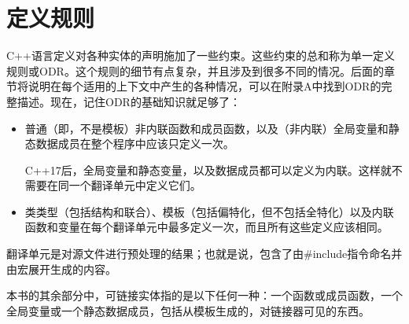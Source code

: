 \section{定义规则}
C++语言定义对各种实体的声明施加了一些约束。这些约束的总和称为单一定义规则或ODR。这个规则的细节有点复杂，并且涉及到很多不同的情况。后面的章节将说明在每个适用的上下文中产生的各种情况，可以在附录A中找到ODR的完整描述。现在，记住ODR的基础知识就足够了：

\begin{itemize}
\item 
普通（即，不是模板）非内联函数和成员函数，以及（非内联）全局变量和静态数据成员在整个程序中应该只定义一次。

\begin{notice}
C++17后，全局变量和静态变量，以及数据成员都可以定义为内联。这样就不需要在同一个翻译单元中定义它们。
\end{notice}

\item 
类类型（包括结构和联合）、模板（包括偏特化，但不包括全特化）以及内联函数和变量在每个翻译单元中最多定义一次，而且所有这些定义应该相同。
\end{itemize}

翻译单元是对源文件进行预处理的结果；也就是说，包含了由\#include指令命名并由宏展开生成的内容。

本书的其余部分中，可链接实体指的是以下任何一种：一个函数或成员函数，一个全局变量或一个静态数据成员，包括从模板生成的，对链接器可见的东西。




































